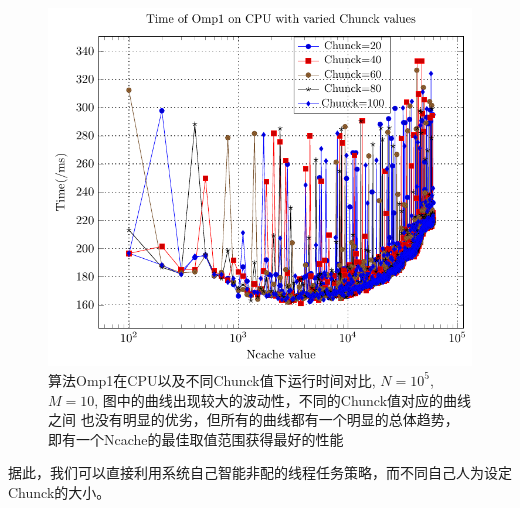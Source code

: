 \begin{figure}[!t]
   \centering
   \includegraphics[width=\textwidth]{chap5/Figures/bsV1-CPU-Time-Chunck.pdf}
   \caption{算法Omp1在CPU以及不同Chunck值下运行时间对比, $N=10^5$, $M=10$, 图中的曲线出现较大的波动性，不同的Chunck值对应的曲线之间
   也没有明显的优劣，但所有的曲线都有一个明显的总体趋势，即有一个Ncache的最佳取值范围获得最好的性能}
   \label{fig:v1-cpu-chunck-Ncache}
\end{figure}
据此，我们可以直接利用系统自己智能非配的线程任务策略，而不同自己人为设定Chunck的大小。
